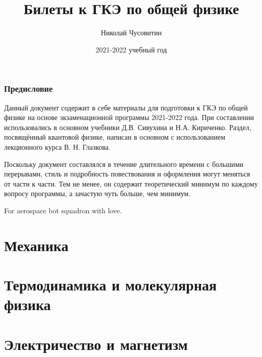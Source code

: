 \documentclass[a4paper,12pt]{article}
\title{Билеты к ГКЭ по общей физике}
\author{Николай Чусовитин}
\date{2021-2022 учебный год}
\begin{document}
\maketitle

\section*{Предисловие}

Данный документ содержит в себе материалы для подготовки к ГКЭ по общей физике на основе экзаменационной программы 2021-2022 года. При составлении использовались в основном учебники Д.В. Сивухина и Н.А. Кириченко. Раздел, посвящённый квантовой физике, написан в основном с использованием лекционного курса В. Н. Глазкова.

Поскольку документ составлялся в течение длительного времени с большими перерывами, стиль и подробность повествования и оформления могут меняться от части к части. Тем не менее, он содержит теоретический минимум по каждому вопросу программы, а зачастую чуть больше, чем минимум.

For aerospace bot squadron with love.

\newpage

\tableofcontents

\newpage
\part{Механика}


\newpage

\newpage

\newpage

\newpage

\newpage

\newpage

\newpage

\newpage

\newpage

\part{Термодинамика и молекулярная физика}


\newpage

\newpage

\newpage

\newpage

\newpage

\newpage

\newpage

\newpage

\newpage

\newpage

\newpage

\part{Электричество и магнетизм}
\end{document}
